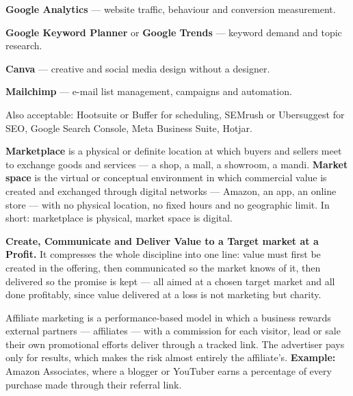 \begin{qlist}
\begin{apts}
\item \textbf{Google Analytics} --- website traffic, behaviour and conversion
      measurement.
\item \textbf{Google Keyword Planner} or \textbf{Google Trends} --- keyword
      demand and topic research.
\item \textbf{Canva} --- creative and social media design without a designer.
\item \textbf{Mailchimp} --- e-mail list management, campaigns and automation.
\end{apts}
Also acceptable: Hootsuite or Buffer for scheduling, SEMrush or Ubersuggest for
SEO, Google Search Console, Meta Business Suite, Hotjar.

\textbf{Marketplace} is a physical or definite location at which buyers and
sellers meet to exchange goods and services --- a shop, a mall, a showroom, a
mandi. \textbf{Market space} is the virtual or conceptual environment in which
commercial value is created and exchanged through digital networks --- Amazon,
an app, an online store --- with no physical location, no fixed hours and no
geographic limit. In short: marketplace is physical, market space is digital.

\textbf{Create, Communicate and Deliver Value to a Target market at a Profit.}
It compresses the whole discipline into one line: value must first be created
in the offering, then communicated so the market knows of it, then delivered so
the promise is kept --- all aimed at a chosen target market and all done
profitably, since value delivered at a loss is not marketing but charity.

Affiliate marketing is a performance-based model in which a business rewards
external partners --- affiliates --- with a commission for each visitor, lead or
sale their own promotional efforts deliver through a tracked link. The
advertiser pays only for results, which makes the risk almost entirely the
affiliate's. \textbf{Example:} Amazon Associates, where a blogger or YouTuber
earns a percentage of every purchase made through their referral link.


\end{qlist}

